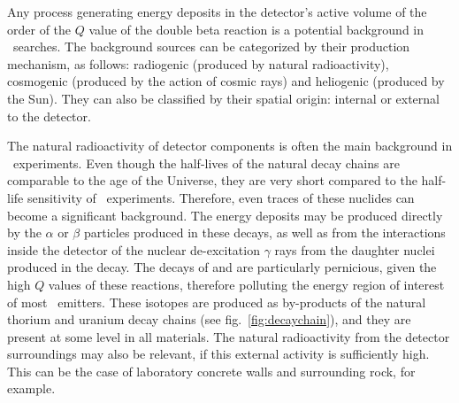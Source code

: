 Any process generating energy deposits in the detector's active volume of the order of the $Q$ value of the double beta reaction is a potential background in \bbonu\ searches. The background sources can be categorized by their production mechanism, as follows: radiogenic (produced by natural radioactivity), cosmogenic (produced by the action of cosmic rays) and heliogenic (produced by the Sun). They can also be classified by their spatial origin: internal or external to the detector.

The natural radioactivity of detector components is often the main background in \bbonu\ experiments. Even though the half-lives of the natural decay chains are comparable to the age of the Universe, they are very short compared to the half-life sensitivity of \bbonu\ experiments. Therefore, even traces of these nuclides can become a significant background. The energy deposits may be produced directly by the $\alpha$ or $\beta$ particles produced in these decays, as well as from the interactions inside the detector of the nuclear de-excitation $\gamma$ rays from the daughter nuclei produced in the decay. The decays of  and  are particularly pernicious, given the high $Q$ values of these reactions, therefore polluting the energy region of interest of most \bb\ emitters. These isotopes are produced as by-products of the natural thorium and uranium decay chains (see fig.~\ref{fig:decaychain}), and they are present at some level in all materials. The natural radioactivity from the detector surroundings may also be relevant, if this external activity is sufficiently high. This can be the case of laboratory concrete walls and surrounding rock, for example. 

